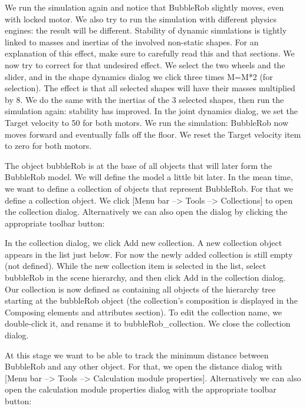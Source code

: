 
We run the simulation again and notice that BubbleRob slightly moves, even 
with locked motor. We also try to run the simulation with different physics
engines: the result will be different. Stability of dynamic simulations is
tightly linked to masses and inertias of the involved non-static shapes. For
an explanation of this effect, make sure to carefully read this and that
sections. We now try to correct for that undesired effect. We select the two
wheels and the slider, and in the shape dynamics dialog we click three times
M=M*2 (for selection). The effect is that all selected shapes will have their
masses multiplied by 8. We do the same with the inertias of the 3 selected
shapes, then run the simulation again: stability has improved. In the joint
dynamics dialog, we set the Target velocity to 50 for both motors. We run
the simulation: BubbleRob now moves forward and eventually falls off the 
floor. We reset the Target velocity item to zero for both motors.

The object bubbleRob is at the base of all objects that will later form the 
BubbleRob model. We will define the model a little bit later. In the mean
time, we want to define a collection of objects that represent BubbleRob.
For that we define a collection object. We click [Menu bar --> Tools --> 
Collections] to open the collection dialog. Alternatively we can also open 
the dialog by clicking the appropriate toolbar button:


In the collection dialog, we click Add new collection. A new collection
object appears in the list just below. For now the newly added collection 
is still empty (not defined). While the new collection item is selected in
the list, select bubbleRob in the scene hierarchy, and then click Add in 
the collection dialog. Our collection is now defined as containing all
objects of the hierarchy tree starting at the bubbleRob object (the 
collection's composition is displayed in the Composing elements and 
attributes section). To edit the collection name, we double-click it, and
rename it to bubbleRob\_collection. We close the collection dialog.

At this stage we want to be able to track the minimum distance between 
BubbleRob and any other object. For that, we open the distance dialog
with [Menu bar --> Tools --> Calculation module properties]. Alternatively
we can also open the calculation module properties dialog with the
appropriate toolbar button:

